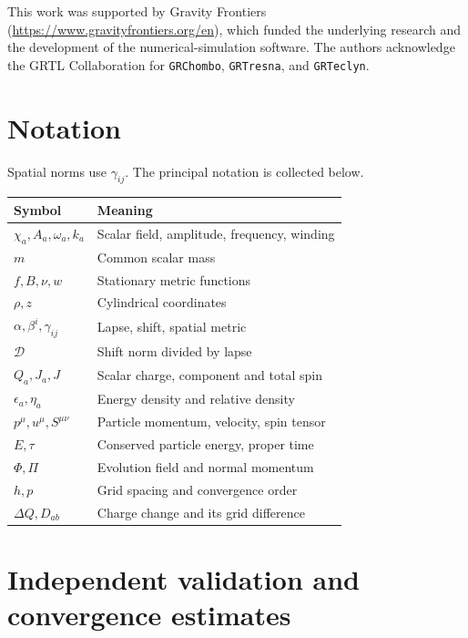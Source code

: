 \documentclass[10pt,twocolumn,floatfix,aps,prd,superscriptaddress,nofootinbib]{revtex4-2}
\begin{document}
\begin{acknowledgments}
This work was supported by Gravity Frontiers
(\url{https://www.gravityfrontiers.org/en}), which funded the underlying
research and the development of the numerical-simulation software. The authors
acknowledge the GRTL Collaboration for \texttt{GRChombo}, \texttt{GRTresna},
and \texttt{GRTeclyn}.
\end{acknowledgments}

\FloatBarrier
\appendix
\section{Notation}
\label{app:notation}

Spatial norms use $\gamma_{ij}$. The principal notation is collected below.
\begin{center}
\footnotesize
\begin{tabular}{@{}p{}p{}@{}}
\hline
Symbol & Meaning\\
\hline
$\chi_a,A_a,\omega_a,k_a$ & Scalar field, amplitude, frequency, winding\\
$m$ & Common scalar mass\\
$f,B,\nu,w$ & Stationary metric functions\\
$\rho,z$ & Cylindrical coordinates\\
$\alpha,\beta^i,\gamma_{ij}$ & Lapse, shift, spatial metric\\
$\mathcal{D}$ & Shift norm divided by lapse\\
$Q_a,J_a,J$ & Scalar charge, component and total spin\\
$\epsilon_a,\eta_a$ & Energy density and relative density\\
$p^\mu,u^\mu,S^{\mu\nu}$ & Particle momentum, velocity, spin tensor\\
$E,\tau$ & Conserved particle energy, proper time\\
$\Phi,\Pi$ & Evolution field and normal momentum\\
$h,p$ & Grid spacing and convergence order\\
$\Delta Q,D_{ab}$ & Charge change and its grid difference\\
\hline
\end{tabular}
\end{center}

\section{Independent validation and convergence estimates}
\label{app:checks}
\end{document}

